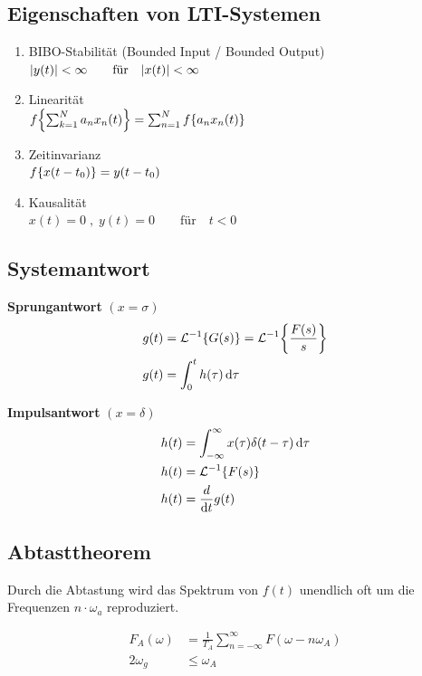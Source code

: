 \subsection{Eigenschaften von LTI-Systemen}
	\begin{mdframed}[style=exercise]
		\begin{enumerate}
			\item BIBO-Stabilität {\footnotesize (Bounded Input / Bounded Output)}\\
				\(\abs{y(t)} < \infty \qquad \text{für} \quad \abs{x(t)} < \infty\)
			\item Linearität\\
				\(f\qty{\sum_{k=1}^{N}a_n x_n(t)}=\sum_{n=1}^{N}f\qty{a_n x_n(t)}\)
			\item Zeitinvarianz\\
				\(f\qty{x(t-t_0)} =y(t-t_0)\)
			\item Kausalität\\
				\(x(t)=0 \; , \; y(t)=0 \qquad \text{für} \quad t < 0\)
		\end{enumerate}
	\end{mdframed}

\subsection{Systemantwort}
	\begin{mdframed}[style=exercise]
		\textbf{Sprungantwort} \((x = \sigma)\)
		\begin{align*}
			g(t) &= \mathcal{L}^{-1}\qty{G(s)} = \mathcal{L}^{-1}\qty{\frac{F(s)}{s}}\\
			g(t) &= \int_{0}^{t} h(\tau) \dd{\tau}
		\end{align*}
	\end{mdframed}
	\begin{mdframed}[style=exercise]
		\textbf{Impulsantwort} \((x = \delta)\)
		\begin{align*}
			h(t) &= \int_{-\infty}^{\infty} x(\tau) \delta(t-\tau) \dd{\tau}\\
			h(t) &= \mathcal{L}^{-1}\qty{F(s)}\\
			h(t) &= \frac{d}{\dd{t}} g(t)
		\end{align*}
	\end{mdframed}

\subsection{Abtasttheorem}
	Durch die Abtastung wird das Spektrum von \(f(t)\) unendlich oft um die Frequenzen \(n\cdot \omega_a\) reproduziert.
	\begin{mdframed}[style=exercise]
		\begin{align}
			F_A(\omega) &= \frac{1}{T_A} \sum_{n=-\infty}^{\infty} F(\omega-n\omega_A)\\
			2\omega_g &\leq \omega_A
		\end{align}
	\end{mdframed}